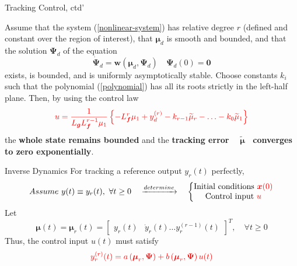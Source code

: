 \documentclass{beamer}
\renewcommand{\vec}[1]{\ensuremath{\boldsymbol{#1}}} %
\begin{document}
\begin{frame}{Tracking Control, ctd'}
    \begin{theorem}[6.4]
      Assume that the system (\ref{nonlinear-system}) has relative degree $r$ (defined and constant over the region of interest), that $\vec{\mu}_{d}$ is smooth and bounded, and that the solution $\vec{\Psi}_{d}$ of the equation
      $$
        \dot{\vec{\Psi}}_{d}=\vec{w}\left(\vec{\mu}_{d}, \vec{\Psi}_{d}\right) \quad \vec{\Psi}_{d}(0)=\vec{0}
      $$
      exists, is bounded, and is uniformly asymptotically stable. Choose constants $k_{i}$ such that the polynomial (\ref{polynomial}) has all its roots strictly in the left-half plane. Then, by using the control law
      \begin{equation}
        {\color{red} u=\frac{1}{L_{\vec{g}} L_{\vec{f}}^{r-1} \mu_{1}}\left\{-L_{\vec{f}}^{r} \mu_{1}+y_{d}^{(r)}-k_{r-1} \widetilde{\mu}_{r}-\ldots-k_{0} \widetilde{\mu}_{1}\right\} }
      \end{equation}
      the \textbf{whole state remains bounded} and the \textbf{tracking error ~ $\widetilde{\vec{\mu}}$~ converges to zero exponentially}.
    \end{theorem}
\end{frame}

\begin{frame}{Inverse Dynamics}
    For {\color{red}tracking a reference output $y_{r}(t)$ perfectly},
    \begin{equation}\label{thought-inverse}\nonumber
     Assume ~y(t)\equiv y_{r}(t), ~\forall t \geq 0 \quad \xrightarrow{determine}\quad \left\{
      \begin{matrix}
        \text{Initial conditions}~{\color{red}\vec{x}(0)} \\
        \text{Control input}~{\color{red}u}
      \end{matrix}\right.
    \end{equation}
    Let
    $$
    \vec{\mu}(t)=\vec{\mu}_{r}(t)=\left[\begin{array}{ll}{y_{r}(t)} & {\dot{y}_{r}(t) \ldots y_{r}^{(r-1)}(t)}\end{array}\right]^{T} , \quad \forall t \geq 0
    $$
    Thus, the control input $u(t)$ must satisfy
    $$
    {\color{red}y_{r}^{(r)}(t)=a\left(\vec{\mu}_{r}, \vec{\Psi}\right)+b\left(\vec{\mu}_{r}, \vec{\Psi} \right) u(t)}
    $$
\end{frame}
\end{document}
